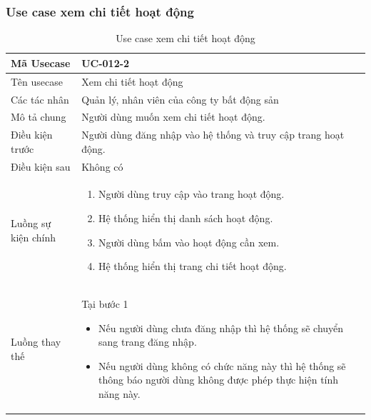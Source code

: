 \documentclass[12pt,a4paper]{article}
\begin{document}
    \subsubsection*{Use case xem chi tiết hoạt động }
    \begin{table}[H]
        \centering
        \begin{tabular}{|p{3.5cm}|p{11.5cm}|c|}
            \hline
            Mã Usecase      & UC-012-2                                                       \\
            \hline
            Tên usecase     & Xem chi tiết hoạt động                                         \\
            \hline
            Các tác nhân    & Quản lý, nhân viên của công ty bất động sản                    \\
            \hline
            Mô tả chung     & Người dùng muốn xem chi tiết hoạt động.                        \\
            \hline

            Điều kiện trước & Người dùng đăng nhập vào hệ thống và truy cập trang hoạt động. \\
            \hline

            Điều kiện sau   & Không có                                                       \\
            \hline

            Luồng sự kiện chính & \vspace{-.8cm}\begin{enumerate}
                                                    \item Người dùng truy cập vào trang hoạt động.
                                                    \item Hệ thống hiển thị danh sách hoạt động.
                                                    \item Người dùng bấm vào hoạt động cần xem.
                                                    \item Hệ thống hiển thị trang chi tiết hoạt động.
            \end{enumerate}
            \\
            \hline
            Luồng thay thế & Tại bước 1\newline
            \vspace{-.8cm}\begin{itemize}
                              \item Nếu người dùng chưa đăng nhập thì hệ thống sẽ chuyển sang trang đăng nhập.
                              \item  Nếu người dùng không có chức năng này thì hệ thống sẽ thông báo người dùng không được phép thực hiện tính năng này.
            \end{itemize}

            \\    \hline
        \end{tabular}
        \caption{Use case xem chi tiết hoạt động }
    \end{table}
\end{document}

